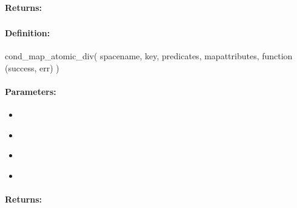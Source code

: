 \paragraph{Returns:}


\pagebreak
\subsubsection{}
\label{api:nodejs:cond_map_atomic_div}


\paragraph{Definition:}
\begin{javascriptcode}
cond_map_atomic_div(
        spacename, key, predicates, mapattributes, function (success, err) {})
\end{javascriptcode}
\paragraph{Parameters:}
\begin{itemize}[noitemsep]
\item {}\\

\item {}\\

\item {}\\

\item {}\\

\end{itemize}

\paragraph{Returns:}


\pagebreak
\subsubsection{}
\label{api:nodejs:group_map_atomic_div}


